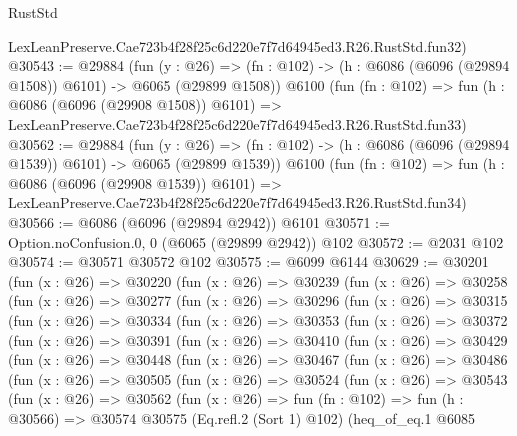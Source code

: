 \begin{lexlean}{RustStd}
\begin{coremodule}
    LexLeanPreserve.Cae723b4f28f25c6d220e7f7d64945ed3.R26.RustStd.fun32)
@30543 := @29884
    (fun (y : @26) =>
    (fn : @102) -> (h : @6086 (@6096 (@29894 @1508)) @6101) -> @6065 (@29899 @1508))
    @6100
    (fun (fn : @102) =>
    fun (h : @6086 (@6096 (@29908 @1508)) @6101) =>
    LexLeanPreserve.Cae723b4f28f25c6d220e7f7d64945ed3.R26.RustStd.fun33)
@30562 := @29884
    (fun (y : @26) =>
    (fn : @102) -> (h : @6086 (@6096 (@29894 @1539)) @6101) -> @6065 (@29899 @1539))
    @6100
    (fun (fn : @102) =>
    fun (h : @6086 (@6096 (@29908 @1539)) @6101) =>
    LexLeanPreserve.Cae723b4f28f25c6d220e7f7d64945ed3.R26.RustStd.fun34)
@30566 := @6086 (@6096 (@29894 @2942)) @6101
@30571 := Option.noConfusion.{0, 0} (@6065 (@29899 @2942)) @102
@30572 := @2031 @102
@30574 := @30571 @30572 @102
@30575 := @6099 @6144
@30629 := @30201
    (fun (x : @26) =>
    @30220
      (fun (x : @26) =>
      @30239
        (fun (x : @26) =>
        @30258
          (fun (x : @26) =>
          @30277
            (fun (x : @26) =>
            @30296
              (fun (x : @26) =>
              @30315
                (fun (x : @26) =>
                @30334
                  (fun (x : @26) =>
                  @30353
                    (fun (x : @26) =>
                    @30372
                      (fun (x : @26) =>
                      @30391
                        (fun (x : @26) =>
                        @30410
                          (fun (x : @26) =>
                          @30429
                            (fun (x : @26) =>
                            @30448
                              (fun (x : @26) =>
                              @30467
                                (fun (x : @26) =>
                                @30486
                                  (fun (x : @26) =>
                                  @30505
                                    (fun (x : @26) =>
                                    @30524
                                      (fun (x : @26) =>
                                      @30543
                                        (fun (x : @26) =>
                                        @30562
                                          (fun (x : @26) =>
                                          fun (fn : @102) =>
                                          fun (h : @30566) =>
                                          @30574
                                            @30575
                                            (Eq.refl.{2} (Sort 1) @102)
                                            (heq_of_eq.{1}
                                              @6085

\end{coremodule}
\end{lexlean}
